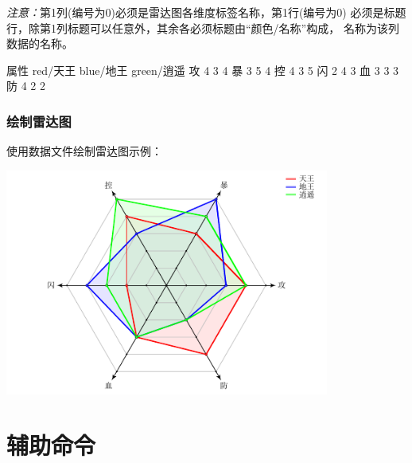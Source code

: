 \documentclass[DIV         = 12,
               fontsize    = 10,
               headinclude = false,
               index       = totoc,
               footinclude = false,
               twoside,
               headings    = small
               ]{tkz-doc}
\begin{document}
\emph{注意：}第1列(编号为0)必须是雷达图各维度标签名称，第1行(编号为0)
必须是标题行，除第1列标题可以任意外，其余各必须标题由``颜色/名称''构成，
名称为该列数据的名称。

\begin{tkzltxexample}[]
  属性 red/天王 blue/地王 green/逍遥
  攻   4        3        4
  暴   3        5        4
  控   4        3        5
  闪   2        4        3
  血   3        3        3
  防   4        2        2
\end{tkzltxexample}

\subsubsection{绘制雷达图}
使用数据文件绘制雷达图示例：

\begin{tkzexample}[latex=9cm, code only]
\end{tkzexample}


\begin{center}
 \includegraphics[width=0.8\textwidth]{radar7} 
\end{center}

\newpage
\section{辅助命令}
\end{document}
